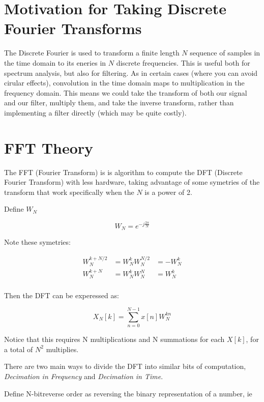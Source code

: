 \documentclass{article}
\begin{document}
\section{Motivation for Taking Discrete Fourier Transforms}

The Discrete Fourier is used to transform a finite length $N$ sequence of samples in the time domain to its eneries
in $N$ discrete frequencies. This is useful both for spectrum analysis, but also for filtering. As in certain cases
(where you can avoid cirular effects), convolution in the time domain maps to multiplication in the frequency domain.
This means we could take the transform of both our signal and our filter, multiply them, and take the inverse transform,
rather than implementing a filter directly (which may be quite costly).

\section{FFT Theory}
The FFT (Fourier Transform) is is algorithm to compute the DFT (Discrete Fourier Transform) with less hardware, taking advantage
of some symetries of the transform that work specifically when the $N$ is a power of 2.

Define $W_{N}$

\begin{equation*} W_{N} = e^{-j \frac{2 \pi}{N}} \end{equation*}

Note these symetries:

\begin{align*}
  W_{N}^{k+N/2} &= W_{N}^{k}W_{N}^{N/2} &= -W_{N}^{k} \\
  W_{N}^{k+N}   &= W_{N}^{k}W_{N}^{N}   &= W_{N}^{k} \\
\end{align*}

Then the DFT can be experessed as:

\begin{equation}  X_{N}[k] = \sum_{n=0}^{N-1} x[n] W_{N}^{kn} \end{equation}

Notice that this requires N multiplications and N summations for each $X[k]$, for a total of $N^{2}$ multiplies.

There are two main ways to divide the DFT into similar bits of computation,
\emph{Decimation in Frequency} and \emph{Decimation in Time}.

Define N-bitreverse order as reversing the binary representation of a number, ie
\end{document}
